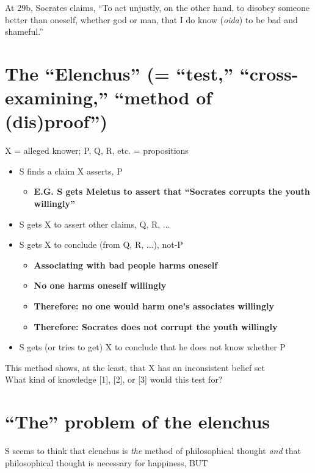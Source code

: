 \documentclass[11pt]{article}
\begin{document}
\noindent At 29b, Socrates claims, ``To act unjustly, on the other hand, to disobey someone better than oneself, whether god or man, that I do know (\emph{oida}) to be bad and shameful.''

\section*{The ``Elenchus'' (= ``test,'' ``cross-examining,'' ``method of (dis)proof'')}
\noindent X = alleged knower; P, Q, R, etc. = propositions
\begin{itemize}
\item{S finds a claim X asserts, P}\begin{itemize}\item{\textbf{E.G. S gets Meletus to assert that ``Socrates corrupts the youth willingly''}}\end{itemize}
\item{S gets X to assert other claims, Q, R, ...}

\item{S gets X to conclude (from Q, R, ...), not-P}\begin{itemize}\item{\textbf{Associating with bad people harms oneself}}\item{\textbf{No one harms oneself willingly}}\item{\textbf{Therefore: no one would harm one's associates willingly}}\item{\textbf{Therefore: Socrates does not corrupt the youth willingly}}\end{itemize}

\item{S gets (or tries to get) X to conclude that he does not know whether P}\end{itemize}

\noindent This method shows, at the least, that X has an inconsistent belief set\\

\noindent What kind of knowledge [1], [2], or [3] would this test for?
\vspace*{-2mm}
\section*{``The'' problem of the elenchus}
\noindent S seems to think that elenchus is \emph{the} method of philosophical thought \emph{and} that philosophical thought is necessary for happiness, BUT
\vspace*{2mm}
\end{document}
